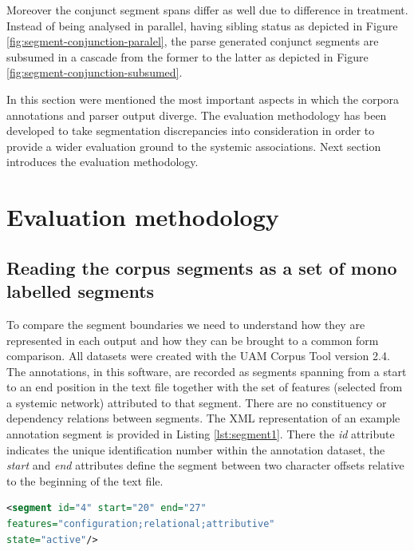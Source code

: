     Moreover the conjunct segment spans differ as well due to difference in treatment. Instead of being analysed in parallel, having sibling status as depicted in Figure \ref{fig:segment-conjunction-paralel}, the parse generated conjunct segments are subsumed in a cascade from the former to the latter as depicted in Figure \ref{fig:segment-conjunction-subsumed}.
    
    In this section were mentioned the most important aspects in which the corpora annotations and parser output diverge. The evaluation methodology has been developed to take segmentation discrepancies into consideration in order to provide a wider evaluation ground to the systemic associations. Next section introduces the evaluation methodology.
    
\section{Evaluation methodology}
\label{sec:evaluation-methodology}

\subsection{Reading the corpus segments as a set of mono labelled segments}

    To compare the segment boundaries we need to understand how they are represented in each output and how they can be brought to a common form comparison. 
    All datasets were created with the UAM Corpus Tool \citep{ODonnell2008,ODonnell2008a} version 2.4. The annotations, in this software, are recorded as segments spanning from a start to an end position in the text file together with the set of features (selected from a systemic network) attributed to that segment. There are no constituency or dependency relations between segments. The XML representation of an example annotation segment is provided in Listing \ref{lst:segment1}. There the \textit{id} attribute indicates the unique identification number within the annotation dataset, the \textit{start} and \textit{end} attributes define the segment between two character offsets relative to the beginning of the text file.

\begin{minipage}{\linewidth}
\begin{lstlisting}[language=XML,basicstyle=\small\tt,frame=single,caption=Segment example in UAM corpus tool,label=lst:segment1]
<segment id="4" start="20" end="27" 
features="configuration;relational;attributive" 
state="active"/>
\end{lstlisting}
\end{minipage}

